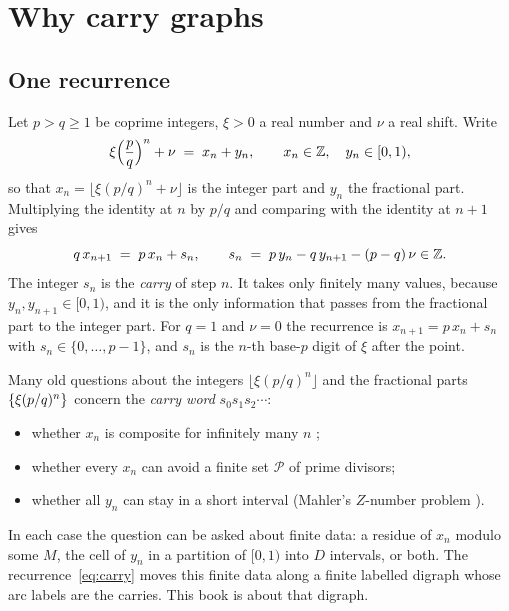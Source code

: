 \chapter{Why carry graphs}\label{ch:overview}

\section{One recurrence}

Let \(p>q\ge 1\) be coprime integers, \(\xi>0\) a real number and \(\nu\) a real shift.
Write
\[
  \xi\Bigl(\frac pq\Bigr)^{n}+\nu \;=\; x_n+y_n,\qquad x_n\in\mathbb{Z},\quad y_n\in[0,1),
\]
so that \(x_n=\lfloor \xi(p/q)^n+\nu\rfloor\) is the integer part and \(y_n\) the fractional
part. Multiplying the identity at \(n\) by \(p/q\) and comparing with the identity at \(n+1\)
gives
\begin{equation}\label{eq:carry}
  q\,x_{n+1} \;=\; p\,x_n + s_n,
  \qquad
  s_n \;=\; p\,y_n - q\,y_{n+1} - (p-q)\,\nu \in \mathbb{Z} .
\end{equation}
The integer \(s_n\) is the \emph{carry} of step \(n\). It takes only finitely many values,
because \(y_n,y_{n+1}\in[0,1)\), and it is the only information that passes from the
fractional part to the integer part. For \(q=1\) and \(\nu=0\) the recurrence is
\(x_{n+1}=p\,x_n+s_n\) with \(s_n\in\{0,\dots,p-1\}\), and \(s_n\) is the \(n\)-th base-\(p\)
digit of \(\xi\) after the point.

Many old questions about the integers \(\lfloor\xi(p/q)^n\rfloor\) and the fractional parts
\(\{\xi(p/q)^n\}\) concern the \emph{carry word} \(s_0s_1s_2\cdots\):
\begin{itemize}
\item whether \(x_n\) is composite for infinitely many \(n\) \cite{FS67,DN05,Dub09};
\item whether every \(x_n\) can avoid a finite set \(\mathcal P\) of prime divisors;
\item whether all \(y_n\) can stay in a short interval
  (Mahler's \(Z\)-number problem \cite{Mah68,FLP95}).
\end{itemize}
In each case the question can be asked about finite data: a residue of \(x_n\) modulo some
\(M\), the cell of \(y_n\) in a partition of \([0,1)\) into \(D\) intervals, or both. The
recurrence~\eqref{eq:carry} moves this finite data along a finite labelled digraph whose arc
labels are the carries. This book is about that digraph.

